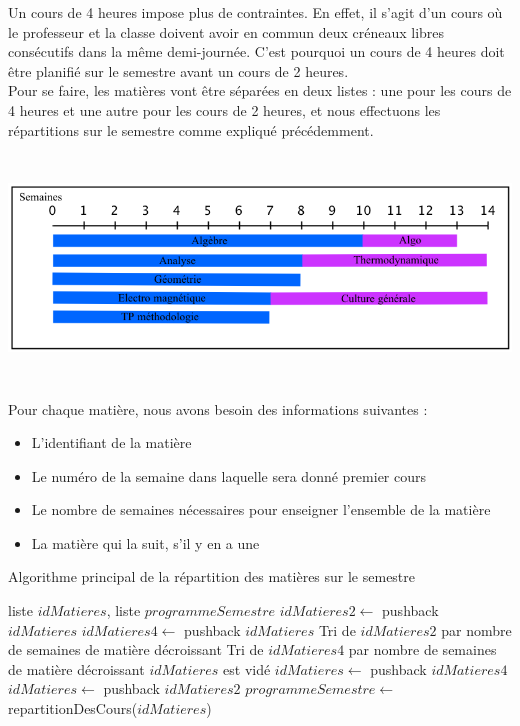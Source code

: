 \documentclass[12pt,a4paper,french]{article}
\begin{document}
Un cours de 4 heures impose plus de contraintes. En effet, il s'agit d'un cours où le professeur et la classe doivent avoir en commun deux créneaux libres consécutifs dans la même demi-journée. C'est pourquoi un cours de 4 heures doit être planifié sur le semestre avant un cours de 2 heures.\\

Pour se faire, les matières vont être séparées en deux listes : une pour les cours de 4 heures et une autre pour les cours de 2 heures, et nous effectuons les répartitions sur le semestre comme expliqué précédemment.\\

\begin{center}
\includegraphics [width=150mm, height=60mm]{RepartitionSemestre.png}
\end{center}

Pour chaque matière, nous avons besoin des informations suivantes :
\begin{itemize}
\item L'identifiant de la matière
\item Le numéro de la semaine dans laquelle sera donné premier cours
\item Le nombre de semaines nécessaires pour enseigner l'ensemble de la matière
\item La matière qui la suit, s'il y en a une
\end{itemize}

\begin{algorithm}
\caption{Algorithme principal de la répartition des matières sur le semestre}
\begin{algorithmic}
\REQUIRE liste $idMatieres$, liste $programmeSemestre$
\STATE $idMatieres2 \leftarrow$ pushback $idMatieres$
\ELSE
\STATE $idMatieres4 \leftarrow$ pushback $idMatieres$
\ENDIF
\ENDFOR
\STATE Tri de $idMatieres2$ par nombre de semaines de matière décroissant
\STATE Tri de $idMatieres4$ par nombre de semaines de matière décroissant
\STATE $idMatieres$ est vidé
\STATE $idMatieres \leftarrow$ pushback $idMatieres4$
\ENDFOR
{}
\STATE $idMatieres \leftarrow$ pushback $idMatieres2$
\ENDFOR
\RETURN $programmeSemestre \leftarrow$ repartitionDesCours($idMatieres$)
\end{algorithmic}
\end{algorithm}
\end{document}

